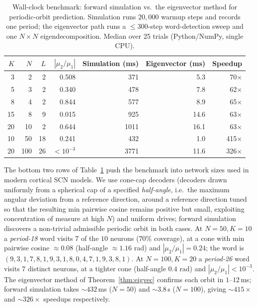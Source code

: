 \documentclass[12pt]{article}
\begin{document}
\begin{table}[t]
\centering
\caption{Wall-clock benchmark: forward simulation vs.\ the eigenvector method for periodic-orbit prediction. Simulation runs $20{,}000$ warmup steps and records one period; the eigenvector path runs a $\leq 300$-step word-detection sweep and one $N{\times}N$ eigendecomposition. Median over 25 trials (Python/NumPy, single CPU).}\label{tab:bench}
\begin{tabular}{rrrrrrr}
\toprule
$K$ & $N$ & $L$ & $|\mu_2/\mu_1|$ & Simulation (ms) & Eigenvector (ms) & Speedup \\
\midrule
3  & 2  & 2 & 0.508 & 371  & 5.3  & 70$\times$ \\
5  & 3  & 2 & 0.340 & 478  & 7.8  & 62$\times$ \\
8  & 4  & 2 & 0.844 & 577  & 8.9  & 65$\times$ \\
15 & 8   & 9 & 0.015 & 925   & 14.6  & 63$\times$ \\
20 & 10  & 2 & 0.644 & 1011  & 16.1  & 63$\times$ \\
10 & 50  & 18 & 0.241    & 432   & 1.0   & 415$\times$ \\
20 & 100 & 26 & $<10^{-3}$ & 3771  & 11.6  & 326$\times$ \\
\bottomrule
\end{tabular}
\end{table}

The bottom two rows of Table~\ref{tab:bench} push the benchmark into network sizes used in modern cortical SCN models. We use cone-cap decoders (decoders drawn uniformly from a spherical cap of a specified \emph{half-angle}, i.e.\ the maximum angular deviation from a reference direction, around a reference direction tuned so that the resulting min pairwise cosine remains positive but small, exploiting concentration of measure at high $N$) and uniform drives; forward simulation discovers a non-trivial admissible periodic orbit in both cases. At $N=50, K=10$ a \emph{period-18} word visits $7$ of the $10$ neurons ($70\%$ coverage), at a cone with min pairwise cosine $\approx 0.08$ (half-angle $\approx 1.16$ rad) and $|\mu_2/\mu_1| = 0.24$; the word is $(9,3,1,7,8,1,9,3,1,8,0,4,7,1,9,3,8,1)$. At $N=100, K=20$ a \emph{period-26} word visits $7$ distinct neurons, at a tighter cone (half-angle $0.4$ rad) and $|\mu_2/\mu_1| < 10^{-3}$. The eigenvector method of Theorem~\ref{thm:eigvec} confirms each orbit in $1$--$12$\,ms; forward simulation takes ${\sim}432$\,ms ($N=50$) and ${\sim}3.8$\,s ($N=100$), giving ${\sim}415\times$ and ${\sim}326\times$ speedups respectively.
\end{document}
